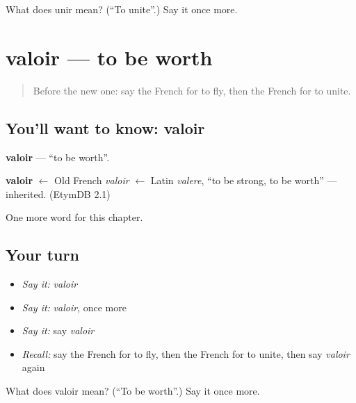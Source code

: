 \begin{tcolorbox}[breakable,colback=teal!4,colframe=teal!35!black,title={Before you move on}]
What does unir mean? (\textquotedblleft{}To unite\textquotedblright{}.) Say it once more.
\end{tcolorbox}
\section[valoir]{valoir — to be worth}

\label{lesson:FR-C239-valoir}



\begin{quote}
Before the new one: say the French for to fly, then the French for to unite.
\end{quote}

\subsection*{You'll want to know: valoir}
\textbf{valoir} — \textquotedblleft{}to be worth\textquotedblright{}.

\begin{cousinweb}
\textbf{valoir} $\leftarrow$ Old French \emph{valoir} $\leftarrow$ Latin \emph{valere}, \textquotedblleft{}to be strong, to be worth\textquotedblright{} — inherited. (EtymDB 2.1)
\end{cousinweb}

\begin{grammarlens}[title={What you've built}]
One more word for this chapter.
\end{grammarlens}

\subsection*{Your turn}
\begin{itemize}
\raggedright
  \item \emph{Say it:} \emph{valoir}
  \item \emph{Say it:} \emph{valoir}, once more
  \item \emph{Say it:} say \emph{valoir}
  \item \emph{Recall:} say the French for to fly, then the French for to unite, then say \emph{valoir} again
\end{itemize}

\begin{tcolorbox}[breakable,colback=teal!4,colframe=teal!35!black,title={Before you move on}]
What does valoir mean? (\textquotedblleft{}To be worth\textquotedblright{}.) Say it once more.
\end{tcolorbox}
